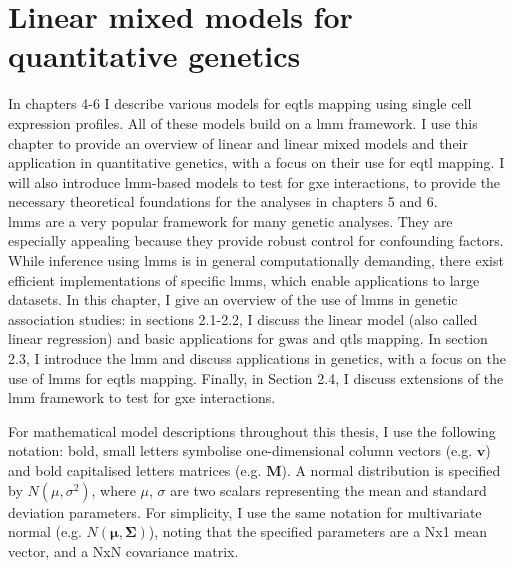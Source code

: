 
\chapter{Linear mixed models for quantitative genetics}

In chapters 4-6 I describe various models for \gls{eqtls} mapping using single cell expression profiles. 
All of these models build on a \gls{lmm} framework. 
I use this chapter to provide an overview of linear and linear mixed models and their application in quantitative genetics, with a focus on their use for e\gls{qtl} mapping. 
I will also introduce \gls{lmm}-based models to test for \gls{gxe} interactions, to provide the necessary theoretical foundations for the analyses in chapters 5 and 6.\\

\gls{lmm}s are a very popular framework for many genetic analyses. 
They are especially appealing because they provide robust control for confounding factors. 
While inference using \gls{lmm}s is in general computationally demanding, there exist efficient implementations of specific \gls{lmm}s, which enable applications to large datasets. 
In this chapter, I give an overview of the use of \gls{lmm}s in genetic association studies: in sections 2.1-2.2, I discuss the linear model (also called linear regression) and basic applications for \gls{gwas} and \gls{qtls} mapping. 
In section 2.3, I introduce the \gls{lmm} and discuss applications in genetics, with a focus on the use of \gls{lmm}s for \gls{eqtls} mapping. 
Finally, in Section 2.4, I discuss extensions of the \gls{lmm} framework to test for \gls{gxe} interactions.\\

\newpage

For mathematical model descriptions throughout this thesis, I use the following notation: bold, small letters symbolise one-dimensional column vectors (e.g. $\mathbf{v}$) and bold capitalised letters matrices (e.g. $\mathbf{M}$). 
A normal distribution is specified by $ N(\mu, \sigma^2)$, where $\mu$, $\sigma$ are two scalars representing the mean and standard deviation parameters.
For simplicity, I use the same notation for multivariate normal (e.g. $ N(\boldsymbol{\mu}, \boldsymbol{\Sigma})$), noting that the specified parameters are a Nx1 mean vector, and a NxN covariance matrix.

